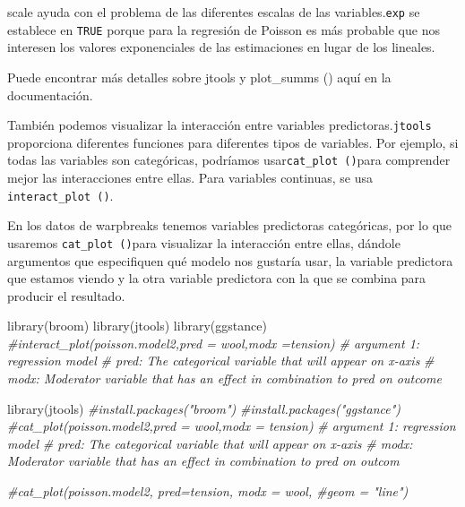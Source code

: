 \documentclass[
]{book}
\newenvironment{Shaded}{\begin{snugshade}}{\end{snugshade}}
\newcommand{\CommentTok}[1]{\textcolor[rgb]{0.56,0.35,0.01}{\textit{#1}}}
\newcommand{\FunctionTok}[1]{\textcolor[rgb]{0.00,0.00,0.00}{#1}}
\newcommand{\NormalTok}[1]{#1}
\begin{document}
scale ayuda con el problema de las diferentes escalas de las variables.\texttt{exp} se establece en \texttt{TRUE} porque para la regresión de Poisson es más probable que nos interesen los valores exponenciales de las estimaciones en lugar de los lineales.

Puede encontrar más detalles sobre jtools y plot\_summs () aquí en la documentación.

También podemos visualizar la interacción entre variables predictoras.\texttt{jtools} proporciona diferentes funciones para diferentes tipos de variables. Por ejemplo, si todas las variables son categóricas, podríamos usar\texttt{cat\_plot\ ()}para comprender mejor las interacciones entre ellas. Para variables continuas, se usa \texttt{interact\_plot\ ()}.

En los datos de warpbreaks tenemos variables predictoras categóricas, por lo que usaremos \texttt{cat\_plot\ ()}para visualizar la interacción entre ellas, dándole argumentos que especifiquen qué modelo nos gustaría usar, la variable predictora que estamos viendo y la otra variable predictora con la que se combina para producir el resultado.

\begin{Shaded}
\begin{Highlighting}[]
\FunctionTok{library}\NormalTok{(broom)}
\FunctionTok{library}\NormalTok{(jtools)}
\FunctionTok{library}\NormalTok{(ggstance)}
\CommentTok{\#interact\_plot(poisson.model2,pred = wool,modx =tension)}
\CommentTok{\# argument 1: regression model}
\CommentTok{\# pred: The categorical variable that will appear on x{-}axis}
\CommentTok{\# modx: Moderator variable that has an effect in combination to pred on outcome}
\end{Highlighting}
\end{Shaded}

\begin{Shaded}
\begin{Highlighting}[]
\FunctionTok{library}\NormalTok{(jtools)}
\CommentTok{\#install.packages("broom")}
\CommentTok{\#install.packages("ggstance")}
\CommentTok{\#cat\_plot(poisson.model2,pred = wool,modx = tension)}
\CommentTok{\# argument 1: regression model}
\CommentTok{\# pred: The categorical variable that will appear on x{-}axis}
\CommentTok{\# modx: Moderator variable that has an effect in combination to pred on outcom}
\end{Highlighting}
\end{Shaded}

\begin{Shaded}
\begin{Highlighting}[]
\CommentTok{\#cat\_plot(poisson.model2, pred=tension, modx = wool, \#geom = "line")}
\end{Highlighting}
\end{Shaded}
\end{document}
